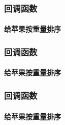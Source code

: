 \documentclass{beamer}
\begin{document}
\begin{frame}
 \frametitle{回调函数}
 \framesubtitle{给苹果按重量排序}

 
\end{frame}

\begin{frame}
 \frametitle{回调函数}
 \framesubtitle{给苹果按重量排序}

 
\end{frame}

\begin{frame}
 \frametitle{回调函数}
 \framesubtitle{给苹果按重量排序}

 
\end{frame}
\end{document}
